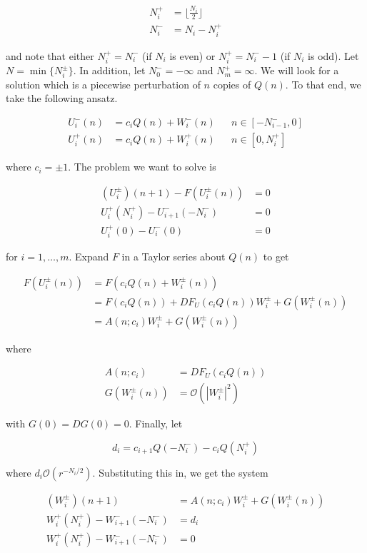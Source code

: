 \documentclass[12pt]{article}
\begin{document}
\begin{align*}
N_i^+ &= \lfloor \frac{N_i}{2} \rfloor \\
N_i^- &= N_i - N_i^+
\end{align*}

and note that either $N_i^+ = N_i^-$ (if $N_i$ is even) or $N_i^+ = N_i^- - 1$ (if $N_i$ is odd). Let $N = \min\{ N_i^\pm \}$. In addition, let $N_0^- = -\infty$ and $N_m^+ = \infty$. We will look for a solution which is a piecewise perturbation of $n$ copies of $Q(n)$. To that end, we take the following ansatz.

\begin{align*}
U_i^-(n) &= c_i Q(n) + W_i^-(n) && n \in [-N_{i-1}^-, 0] \\
U_i^+(n) &= c_i Q(n) + W_i^+(n) && n \in [0, N_i^+]
\end{align*}

where $c_i = \pm 1$. The problem we want to solve is

\begin{align}
(U_i^\pm)(n+1) - F(U_i^\pm(n)) &= 0 \\
U_i^+(N_i^+) - U_{i+1}^-(-N_i^-) &= 0 \\
U_i^+(0) - U_i^-(0) &= 0
\end{align}

for $i = 1, \dots, m$. Expand $F$ in a Taylor series about $Q(n)$ to get

\begin{align*}
F(U_i^\pm(n)) &= F(c_i Q(n) + W_i^\pm(n)) \\
&= F(c_i Q(n)) + DF_{U}(c_i Q(n)) W_i^\pm + G(W_i^\pm(n)) \\
&= A(n; c_i) W_i^\pm + G(W_i^\pm(n))
\end{align*}

where

\begin{align*}
A(n; c_i) &= DF_{U}(c_i Q(n))\\
G(W_i^\pm(n)) &= \mathcal{O}(|W_i^\pm|^2)
\end{align*}

with $G(0) = DG(0) = 0$. Finally, let 

\begin{equation}
d_i = c_{i+1} Q(-N_i^-) - c_i Q(N_i^+)
\end{equation}

where $d_i \mathcal{O}(r^{-N_i/2})$. Substituting this in, we get the system

\begin{align}
(W_i^\pm)(n+1) &= A(n; c_i) W_i^\pm + G(W_i^\pm(n)) \\
W_i^+(N_i^+) - W_{i+1}^-(-N_i^-) &= d_i \\
W_i^+(N_i^+) - W_{i+1}^-(-N_i^-) &= 0 \\
\end{align}
\end{document}
